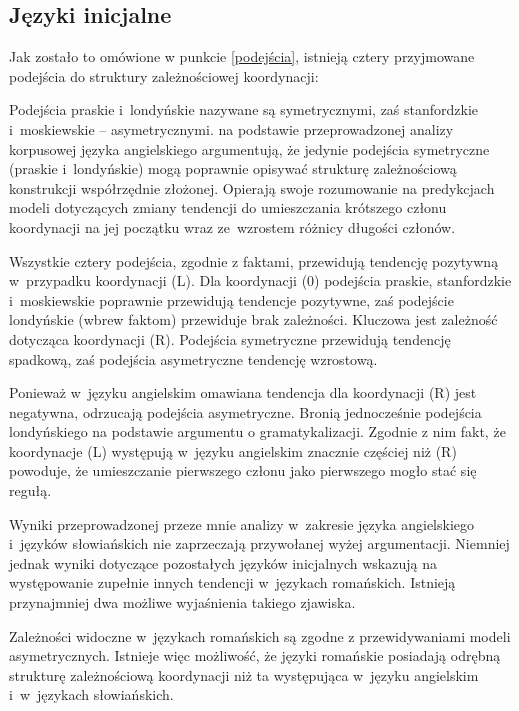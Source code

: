 \subsection{Języki inicjalne}

Jak zostało to omówione w punkcie \ref{podejścia}, istnieją cztery przyjmowane podejścia do struktury zależnościowej koordynacji:



Podejścia praskie i~londyńskie nazywane są symetrycznymi, zaś stanfordzkie i~moskiewskie -- asymetrycznymi. \cite{przepiorkowski2023conjunct} na podstawie przeprowadzonej analizy korpusowej języka angielskiego argumentują, że jedynie podejścia symetryczne (praskie i~londyńskie) mogą poprawnie opisywać strukturę zależnościową konstrukcji współrzędnie złożonej. Opierają swoje rozumowanie na predykcjach modeli dotyczących zmiany tendencji do umieszczania krótszego członu koordynacji na jej początku wraz ze~wzrostem różnicy długości członów.

Wszystkie cztery podejścia, zgodnie z faktami, przewidują tendencję pozytywną w~przypadku koordynacji (L). Dla koordynacji (0) podejścia praskie, stanfordzkie i~moskiewskie poprawnie przewidują tendencje pozytywne, zaś podejście londyńskie (wbrew faktom) przewiduje brak zależności. Kluczowa jest zależność dotycząca koordynacji (R). Podejścia symetryczne przewidują tendencję spadkową, zaś podejścia asymetryczne tendencję wzrostową.

Ponieważ w~języku angielskim omawiana tendencja dla koordynacji (R) jest negatywna, \cite{przepiorkowski2023conjunct} odrzucają podejścia asymetryczne. Bronią jednocześnie podejścia londyńskiego na podstawie argumentu o gramatykalizacji. Zgodnie z nim fakt, że koordynacje (L) występują w~języku angielskim znacznie częściej niż (R) powoduje, że umieszczanie pierwszego członu jako pierwszego mogło stać się regułą.

Wyniki przeprowadzonej przeze mnie analizy w~zakresie języka angielskiego i~języków słowiańskich nie zaprzeczają przywołanej wyżej argumentacji. Niemniej jednak wyniki dotyczące pozostałych języków inicjalnych wskazują na występowanie zupełnie innych tendencji w~językach romańskich. Istnieją przynajmniej dwa możliwe wyjaśnienia takiego zjawiska.

Zależności widoczne w~językach romańskich są zgodne z przewidywaniami modeli asymetrycznych. Istnieje więc możliwość, że języki romańskie posiadają odrębną strukturę zależnościową koordynacji niż ta występująca w~języku angielskim i~w~językach słowiańskich.

